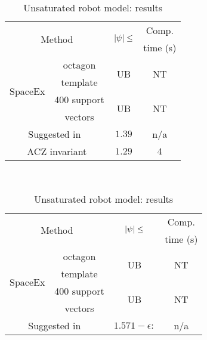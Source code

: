 \begin{table}
\begin{minipage}{0.48\textwidth}
\centering
\begin{tabular}{|l|c|c|c|}
\hline
\multicolumn{2}{|c|}{\multirow{2}{*}{Method}} &
\multirow{2}{*}{$\left|\psi\right|\leq$} & Comp.\\
\multicolumn{2}{|c|}{} & & time (s)\\
\hline
\multirow{4}{*}{SpaceEx} & octagon & \multirow{2}{*}{UB} & \multirow{2}{*}{NT}\\
& template & & \\
\cline{2-4}
& 400 support & \multirow{2}{*}{UB} & \multirow{2}{*}{NT}\\
& vectors & &\\
\hline
\multicolumn{2}{|c|}{\multirow{2}{*}{Suggested in~\cite{heinz2014benchmark}}} &
\multirow{2}{*}{$1.39$} & \multirow{2}{*}{n/a}\\
\multicolumn{2}{|c|}{} & &\\
\hline
\multicolumn{2}{|c|}{\multirow{2}{*}{ACZ invariant}} & \multirow{2}{*}{$1.29$} &
\multirow{2}{*}{$4$}\\
\multicolumn{2}{|c|}{} & & \\
\hline
\end{tabular}
\caption{Unsaturated robot model: results}
~\label{tab:robot-unsaturated}
\end{minipage}
\hspace{0em}
\begin{minipage}{0.48\textwidth}
\centering
\begin{tabular}{|l|c|c|c|}
\hline
\multicolumn{2}{|c|}{\multirow{2}{*}{Method}} &
\multirow{2}{*}{$\left|\psi\right|\leq$} & Comp.\\
\multicolumn{2}{|c|}{} & & time (s)\\
\hline
\multirow{4}{*}{SpaceEx} & octagon & \multirow{2}{*}{UB} &
\multirow{2}{*}{NT}\\
& template & & \\
\cline{2-4}
& 400 support & \multirow{2}{*}{UB} & \multirow{2}{*}{NT}\\
& vectors & & \\
\hline
\multicolumn{2}{|c|}{\multirow{2}{*}{Suggested in~\cite{heinz2014benchmark}}} &
$1.571-\epsilon:$ & \multirow{2}{*}{n/a}\\

\end{tabular}
\end{minipage}
\end{table}
